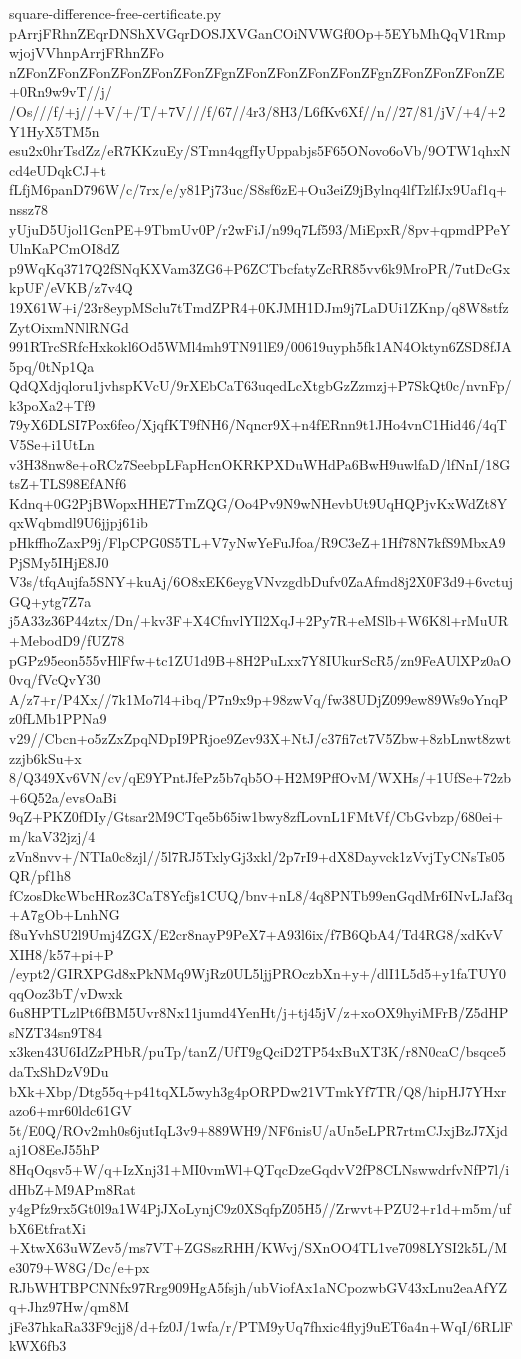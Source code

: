 \documentclass[11pt]{article}
\theoremstyle{definition}
\theoremstyle{remark}
\begin{document}
\begin{filecontents*}[overwrite]{square-difference-free-certificate.py}
pArrjFRhnZEqrDNShXVGqrDOSJXVGanCOiNVWGf0Op+5EYbMhQqV1RmpwjojVVhnpArrjFRhnZFo
nZFonZFonZFonZFonZFonZFonZFgnZFonZFonZFonZFonZFgnZFonZFonZFonZE+0Rn9w9vT//j/
/Os///f/+j//+V/+/T/+7V///f/67//4r3/8H3/L6fKv6Xf//n//27/81/jV/+4/+2Y1HyX5TM5n
esu2x0hrTsdZz/eR7KKzuEy/STmn4qgfIyUppabjs5F65ONovo6oVb/9OTW1qhxNcd4eUDqkCJ+t
fLfjM6panD796W/c/7rx/e/y81Pj73uc/S8sf6zE+Ou3eiZ9jBylnq4lfTzlfJx9Uaf1q+nssz78
yUjuD5Ujol1GcnPE+9TbmUv0P/r2wFiJ/n99q7Lf593/MiEpxR/8pv+qpmdPPeYUlnKaPCmOI8dZ
p9WqKq3717Q2fSNqKXVam3ZG6+P6ZCTbcfatyZcRR85vv6k9MroPR/7utDcGxkpUF/eVKB/z7v4Q
19X61W+i/23r8eypMSclu7tTmdZPR4+0KJMH1DJm9j7LaDUi1ZKnp/q8W8stfzZytOixmNNlRNGd
991RTrcSRfcHxkokl6Od5WMl4mh9TN91lE9/00619uyph5fk1AN4Oktyn6ZSD8fJA5pq/0tNp1Qa
QdQXdjqloru1jvhspKVcU/9rXEbCaT63uqedLcXtgbGzZzmzj+P7SkQt0c/nvnFp/k3poXa2+Tf9
79yX6DLSI7Pox6feo/XjqfKT9fNH6/Nqncr9X+n4fERnn9t1JHo4vnC1Hid46/4qTV5Se+i1UtLn
v3H38nw8e+oRCz7SeebpLFapHcnOKRKPXDuWHdPa6BwH9uwlfaD/lfNnI/18GtsZ+TLS98EfANf6
Kdnq+0G2PjBWopxHHE7TmZQG/Oo4Pv9N9wNHevbUt9UqHQPjvKxWdZt8YqxWqbmdl9U6jjpj61ib
pHkffhoZaxP9j/FlpCPG0S5TL+V7yNwYeFuJfoa/R9C3eZ+1Hf78N7kfS9MbxA9PjSMy5IHjE8J0
V3s/tfqAujfa5SNY+kuAj/6O8xEK6eygVNvzgdbDufv0ZaAfmd8j2X0F3d9+6vctujGQ+ytg7Z7a
j5A33z36P44ztx/Dn/+kv3F+X4CfnvlYIl2XqJ+2Py7R+eMSlb+W6K8l+rMuUR+MebodD9/fUZ78
pGPz95eon555vHlFfw+tc1ZU1d9B+8H2PuLxx7Y8IUkurScR5/zn9FeAUlXPz0aO0vq/fVcQvY30
A/z7+r/P4Xx//7k1Mo7l4+ibq/P7n9x9p+98zwVq/fw38UDjZ099ew89Ws9oYnqPz0fLMb1PPNa9
v29//Cbcn+o5zZxZpqNDpI9PRjoe9Zev93X+NtJ/c37fi7ct7V5Zbw+8zbLnwt8zwtzzjb6kSu+x
8/Q349Xv6VN/cv/qE9YPntJfePz5b7qb5O+H2M9PffOvM/WXHs/+1UfSe+72zb+6Q52a/evsOaBi
9qZ+PKZ0fDIy/Gtsar2M9CTqe5b65iw1bwy8zfLovnL1FMtVf/CbGvbzp/680ei+m/kaV32jzj/4
zVn8nvv+/NTIa0c8zjl//5l7RJ5TxlyGj3xkl/2p7rI9+dX8Dayvck1zVvjTyCNsTs05QR/pf1h8
fCzosDkcWbcHRoz3CaT8Ycfjs1CUQ/bnv+nL8/4q8PNTb99enGqdMr6INvLJaf3q+A7gOb+LnhNG
f8uYvhSU2l9Umj4ZGX/E2cr8nayP9PeX7+A93l6ix/f7B6QbA4/Td4RG8/xdKvVXIH8/k57+pi+P
/eypt2/GIRXPGd8xPkNMq9WjRz0UL5ljjPROczbXn+y+/dlI1L5d5+y1faTUY0qqOoz3bT/vDwxk
6u8HPTLzlPt6fBM5Uvr8Nx11jumd4YenHt/j+tj45jV/z+xoOX9hyiMFrB/Z5dHPsNZT34sn9T84
x3ken43U6IdZzPHbR/puTp/tanZ/UfT9gQciD2TP54xBuXT3K/r8N0caC/bsqce5daTxShDzV9Du
bXk+Xbp/Dtg55q+p41tqXL5wyh3g4pORPDw21VTmkYf7TR/Q8/hipHJ7YHxrazo6+mr60ldc61GV
5t/E0Q/ROv2mh0s6jutIqL3v9+889WH9/NF6nisU/aUn5eLPR7rtmCJxjBzJ7Xjdaj1O8EeJ55hP
8HqOqsv5+W/q+IzXnj31+MI0vmWl+QTqcDzeGqdvV2fP8CLNswwdrfvNfP7l/idHbZ+M9APm8Rat
y4gPfz9rx5Gt0l9a1W4PjJXoLynjC9z0XSqfpZ05H5//Zrwvt+PZU2+r1d+m5m/ufbX6EtfratXi
+XtwX63uWZev5/ms7VT+ZGSszRHH/KWvj/SXnOO4TL1ve7098LYSI2k5L/Me3079+W8G/Dc/e+px
RJbWHTBPCNNfx97Rrg909HgA5fsjh/ubViofAx1aNCpozwbGV43xLnu2eaAfYZq+Jhz97Hw/qm8M
jFe37hkaRa33F9cjj8/d+fz0J/1wfa/r/PTM9yUq7fhxic4flyj9uET6a4n+WqI/6RLlFkWX6fb3

\end{filecontents*}
\end{document}
